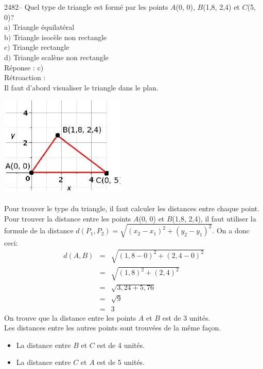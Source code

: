 \documentclass[letterpaper, 12pt]{article}
\begin{document}

2482-- Quel type de triangle est form\'e par les points $A$(0, 0), $B$(1,8, 2,4) et $C$(5, 0)?\\

a$)$ Triangle \'equilat\'eral\\
b$)$ Triangle isoc\`ele non rectangle\\
c$)$ Triangle rectangle\\
d$)$ Triangle scal\`ene non rectangle\\

R\'eponse : c)\\

R\'etroaction :\\
Il faut d'abord visualiser le triangle dans le plan.
\begin{center}
 \includegraphics[width=6cm,bb=14 14 316 291]{Q2482.eps}
\end{center}
Pour trouver le type du triangle, il faut calculer les distances entre chaque point. \\
Pour trouver la distance entre les points $A$(0, 0) et $B$(1,8, 2,4), il faut utiliser la formule de la distance $d(P_{1}, P_{2})=\sqrt{(x_{2}-x_{1})^{2}+(y_{2}-y_{1})^{2}}$. On a donc ceci:
\begin{eqnarray*}
 d(A, B)&=&\sqrt{(1,8-0)^{2}+(2,4-0)^{2}}\\
&=&\sqrt{(1,8)^{2}+(2,4)^{2}}\\
&=&\sqrt{3,24+5,76}\\
&=&\sqrt{9}\\
&=&3
\end{eqnarray*}
On trouve que la distance entre les points $A$ et $B$ est de 3 unit\'es.\\
Les distances entre les autres points sont trouv\'ees de la m\^eme fa\c con.
\begin{itemize}
 \item La distance entre $B$ et $C$ est de 4 unit\'es.
\item La distance entre $C$ et $A$ est de 5 unit\'es.\\
\end{itemize}
\end{document}
